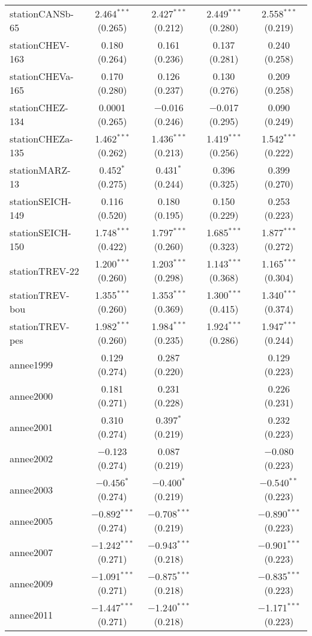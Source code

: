 \begin{table}[!htbp]
\begin{tabular}{@{\extracolsep{5pt}}lcccc}
  stationCANSb-65 & 2.464$^{***}$ (0.265) & 2.427$^{***}$ (0.212) & 2.449$^{***}$ (0.280) & 2.558$^{***}$ (0.219) \\ 
  stationCHEV-163 & 0.180 (0.264) & 0.161 (0.236) & 0.137 (0.281) & 0.240 (0.258) \\ 
  stationCHEVa-165 & 0.170 (0.280) & 0.126 (0.237) & 0.130 (0.276) & 0.209 (0.258) \\ 
  stationCHEZ-134 & 0.0001 (0.265) & $-$0.016 (0.246) & $-$0.017 (0.295) & 0.090 (0.249) \\ 
  stationCHEZa-135 & 1.462$^{***}$ (0.262) & 1.436$^{***}$ (0.213) & 1.419$^{***}$ (0.256) & 1.542$^{***}$ (0.222) \\ 
  stationMARZ-13 & 0.452$^{*}$ (0.275) & 0.431$^{*}$ (0.244) & 0.396 (0.325) & 0.399 (0.270) \\ 
  stationSEICH-149 & 0.116 (0.520) & 0.180 (0.195) & 0.150 (0.229) & 0.253 (0.223) \\ 
  stationSEICH-150 & 1.748$^{***}$ (0.422) & 1.797$^{***}$ (0.260) & 1.685$^{***}$ (0.323) & 1.877$^{***}$ (0.272) \\ 
  stationTREV-22 & 1.200$^{***}$ (0.260) & 1.203$^{***}$ (0.298) & 1.143$^{***}$ (0.368) & 1.165$^{***}$ (0.304) \\ 
  stationTREV-bou & 1.355$^{***}$ (0.260) & 1.353$^{***}$ (0.369) & 1.300$^{***}$ (0.415) & 1.340$^{***}$ (0.374) \\ 
  stationTREV-pes & 1.982$^{***}$ (0.260) & 1.984$^{***}$ (0.235) & 1.924$^{***}$ (0.286) & 1.947$^{***}$ (0.244) \\ 
  annee1999 & 0.129 (0.274) & 0.287 (0.220) &  & 0.129 (0.223) \\ 
  annee2000 & 0.181 (0.271) & 0.231 (0.228) &  & 0.226 (0.231) \\ 
  annee2001 & 0.310 (0.274) & 0.397$^{*}$ (0.219) &  & 0.232 (0.223) \\ 
  annee2002 & $-$0.123 (0.274) & 0.087 (0.219) &  & $-$0.080 (0.223) \\ 
  annee2003 & $-$0.456$^{*}$ (0.274) & $-$0.400$^{*}$ (0.219) &  & $-$0.540$^{**}$ (0.223) \\ 
  annee2005 & $-$0.892$^{***}$ (0.274) & $-$0.708$^{***}$ (0.219) &  & $-$0.890$^{***}$ (0.223) \\ 
  annee2007 & $-$1.242$^{***}$ (0.271) & $-$0.943$^{***}$ (0.218) &  & $-$0.901$^{***}$ (0.223) \\ 
  annee2009 & $-$1.091$^{***}$ (0.271) & $-$0.875$^{***}$ (0.218) &  & $-$0.835$^{***}$ (0.223) \\ 
  annee2011 & $-$1.447$^{***}$ (0.271) & $-$1.240$^{***}$ (0.218) &  & $-$1.171$^{***}$ (0.223) \\ 

\end{tabular}
\end{table}
